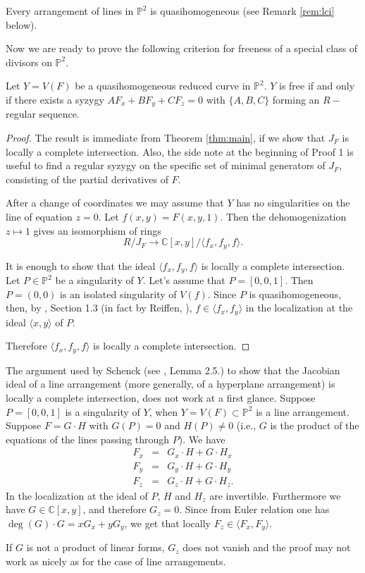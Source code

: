 \documentclass[12pt]{amsart}
\begin{document}
Every arrangement of lines in $\mathbb P^2$ is quasihomogeneous (see Remark \ref{rem:lci} below).

Now we are ready to prove the following criterion for freeness of a special class of divisors on $\mathbb P^2$.

\begin{thm}\label{thm:freediv} Let $Y=V(F)$ be a quasihomogeneous reduced curve in $\mathbb P^2$. $Y$ is free if and only if there exists a syzygy $AF_x+BF_y+CF_z=0$ with $\{A,B,C\}$ forming an $R-$regular sequence.
\end{thm}
\begin{proof} The result is immediate from Theorem \ref{thm:main}, if we show that $J_F$ is locally a complete intersection. Also, the side note at the beginning of Proof 1 is useful to find a regular syzygy on the specific set of minimal generators of $J_F$, consisting of the partial derivatives of $F$.

After a change of coordinates we may assume that $Y$ has no singularities on the line of equation $z=0$. Let $f(x,y)=F(x,y,1)$. Then the dehomogenization $z\mapsto 1$ gives an isomorphism of rings $$R/J_F\rightarrow \mathbb C[x,y]/\langle f_x,f_y,f\rangle.$$

It is enough to show that the ideal $\langle f_x,f_y,f\rangle$ is locally a complete intersection. Let $P\in \mathbb P^2$ be a singularity of $Y$. Let's assume that $P=[0,0,1]$. Then $P=(0,0)$ is an isolated singularity of $V(f)$. Since $P$ is quasihomogeneous, then, by \cite{st}, Section 1.3 (in fact by Reiffen, \cite{r}), $f\in\langle f_x,f_y\rangle$ in the localization at the ideal $\langle x,y\rangle$ of $P$.

Therefore $\langle f_x,f_y,f\rangle$ is locally a complete intersection. \end{proof}

\begin{rem}\label{rem:lci} The argument used by Schenck (see \cite{s2}, Lemma 2.5.) to show that the Jacobian ideal of a line arrangement (more generally, of a hyperplane arrangement) is locally a complete intersection, does not work at a first glance. Suppose $P=[0,0,1]$ is a singularity of $Y$, when $Y=V(F)\subset\mathbb P^2$ is a line arrangement. Suppose $F=G\cdot H$ with $G(P)=0$ and $H(P)\neq 0$ (i.e., $G$ is the product of the equations of the lines passing through $P$). We have
\begin{eqnarray} F_x&=&G_x\cdot H+G\cdot H_x\nonumber\\
F_y&=&G_y\cdot H+G\cdot H_y\nonumber\\
F_z&=&G_z\cdot H+G\cdot H_z.\nonumber
\end{eqnarray} In the localization at the ideal of $P$, $H$ and $H_z$ are invertible. Furthermore we have $G\in \mathbb C[x,y]$, and therefore $G_z=0$. Since from Euler relation one has $\deg(G)\cdot G=xG_x+yG_y$, we get that locally $F_z\in\langle F_x,F_y\rangle$.

If $G$ is not a product of linear forms, $G_z$ does not vanish and the proof may not work as nicely as for the case of line arrangements.
\end{rem}
\end{document}
